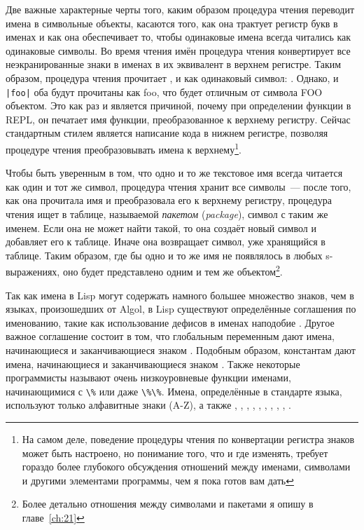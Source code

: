 Две важные характерные черты того, каким образом процедура чтения переводит имена в
символьные объекты, касаются того, как она трактует регистр букв в именах и как она
обеспечивает то, чтобы одинаковые имена всегда читались как одинаковые символы. Во время
чтения имён процедура чтения конвертирует все неэкранированные знаки в именах в их
эквивалент в верхнем регистре. Таким образом, процедура чтения прочитает ,
 и  как одинаковый символ: . Однако,
 и \lstinline!|foo|! оба 
будут прочитаны как foo, что будет отличным от символа FOO объектом. Это как раз и
является причиной, почему при определении функции в REPL, он печатает имя функции,
преобразованное к верхнему регистру. Сейчас стандартным стилем является написание кода в
нижнем регистре, позволяя процедуре чтения преобразовывать имена к верхнему\footnote{На
  самом деле, поведение процедуры чтения по конвертации регистра знаков может быть
  настроено, но понимание того, что и где изменять, требует гораздо более глубокого
  обсуждения отношений между именами, символами и другими элементами программы, чем
  я пока готов вам дать}.

Чтобы быть уверенным в том, что одно и то же текстовое имя всегда читается как один и тот
же символ, процедура чтения хранит все символы~--- после того, как она прочитала имя и
преобразовала его к верхнему регистру, процедура чтения ищет в таблице, называемой
\textit{пакетом} (\textit{package}), символ с таким же именем. Если она не может найти
такой, то она создаёт новый символ и добавляет его к таблице. Иначе она возвращает символ,
уже хранящийся в таблице. Таким образом, где бы одно и то же имя не появлялось в любых
s-выражениях, оно будет представлено одним и тем же объектом\footnote{Более детально
  отношения между символами и пакетами я опишу в главе~\ref{ch:21}}.

Так как имена в Lisp могут содержать намного большее множество знаков, чем в языках,
произошедших от Algol, в Lisp существуют определённые соглашения по именованию, такие как
использование дефисов в именах наподобие . Другое важное соглашение
состоит в том, что глобальным переменным дают имена, начинающиеся и заканчивающиеся знаком
\code{*}. Подобным образом, константам дают имена, начинающиеся и заканчивающиеся знаком
\code{+}. Также некоторые программисты называют очень низкоуровневые функции именами,
начинающимися с \lstinline!\%! или даже \lstinline!\%\%!. Имена, определённые в стандарте
языка, используют только алфавитные знаки (A-Z), а также \code{*}, \code{+}, \code{-},
\code{/}, , , \code{<}, \code{=}, \code{>}, \code{\&}.

